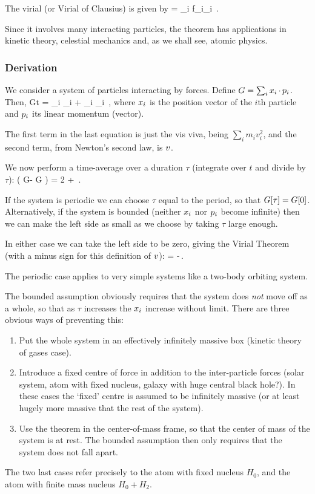 The virial (or Virial of Clausius) is given by
\beq
\pen = \sum_i f_i\iprod\pvec_i \,.
\eeq

Since it involves many interacting particles, the theorem has applications in kinetic theory, celestial mechanics and, as we shall see, atomic physics.


\subsubsection{Derivation}
We consider a system of particles interacting by forces. Define $G = \sum_i x_i\operatorname{\cdot} p_i$. Then,
\beq
\xod Gt = \sum_i \iprod \lmom_i + \sum_i \pvec_i\iprod{} \,,
\eeq
where $x_i$ is the position vector of the $i$th particle and $p_i$ its linear momentum (vector).

The first term in the last equation is just the vis viva, being $\sum_i m_i v_i^2$, and the second term, from Newton's second law, is $v$.

We now perform a time-average over a duration $\tau$ (integrate over $t$ and divide by $\tau$):
\beq
{}\left( G\vat\tau - G \right) = 2\avg{\ken} + \avg{\pen}\,.
\eeq

If the system is periodic we can choose $\tau$ equal to the period, so that $G\!\left[{\tau}\right] = G\!\left[{0}\right]$. Alternatively, if the system is bounded (neither $x_i$ nor $p_i$ become infinite) then we can make the left side as small as we choose by taking $\tau$ large enough.

In either case we can take the left side to be zero, giving the Virial Theorem (with a minus sign for this definition of $v$):
\avg{\ken} = -\pen\,.
\eeq

The periodic case applies to very simple systems like a two-body orbiting system.

The bounded assumption obviously requires that the system does \emph{not} move off as a whole, so that as $\tau$ increases the $x_i$ increase without limit. There are three obvious ways of preventing this:
\begin{enumerate}
\item Put the whole system in an effectively infinitely massive box (kinetic theory of gases case).
%
\item Introduce a fixed centre of force in addition to the inter-particle forces (solar system, atom with fixed nucleus, galaxy with huge central black hole?). In these cases the `fixed' centre is assumed to be infinitely massive (or at least hugely more massive that the rest of the system).
%
\item Use the theorem in the center-of-mass frame, so that the center of mass of the system is at rest. The bounded assumption then only requires that the system does not fall apart.
\end{enumerate}
The two last cases refer precisely to the atom with fixed nucleus $H_0$, and the atom with finite mass nucleus $H_0 + H_2$.


